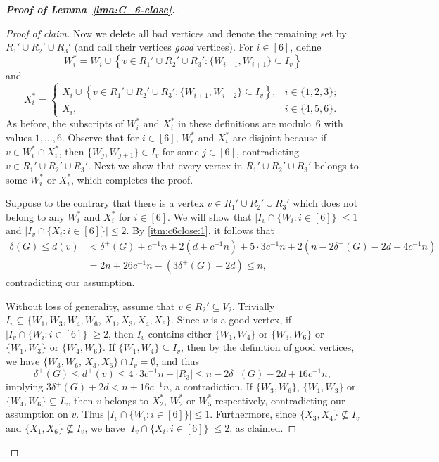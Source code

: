 \documentclass[11pt]{article}
\newenvironment{proofclaim}[1][Proof of claim]{\begin{proof}[#1]\renewcommand*{\qedsymbol}{\(\blacksquare\)}}{\end{proof}}
\numberwithin{equation}{section}
\begin{document}
\begin{proof}[\textbf{Proof of Lemma~\ref{lma:C_6-close}.}]
\begin{proofclaim}
Now we delete all bad vertices and denote the remaining set by $R_1'\cup R_2' \cup R_3'$ (and call their vertices \emph{good} vertices). For $i\in [6]$, define $$W_i^* = W_i\cup \left\{v\in R_1'\cup R_2' \cup R_3': \{W_{i-1},W_{i+1}\}\subseteq I_v\right\}$$ and $$X_{i}^* =\begin{cases}
      X_{i}\cup \left\{v\in R_1'\cup R_2' \cup R_3': \{ W_{i+1},W_{i-2}\}\subseteq I_v\right\} , & i\in \{1,2,3\};\\
      X_i, & i\in \{4,5,6\}.
     \end{cases} $$ 
As before, the subscripts of $W_i^*$ and $X_i^*$ in these definitions are modulo~$6$ with values $1, \dots, 6$. 
Observe that for $i\in [6]$, $W_i^*$ and $X_i^*$ are disjoint because if $v\in W_i^*\cap X_i^*$, then $\{ W_j, W_{j+1} \} \in I_v$ for some $j\in [6]$, contradicting $v\in R_1'\cup R_2' \cup R_3'$.
Next we show that every vertex in $R_1'\cup R_2' \cup R_3'$ belongs to some $W_i^*$ or $X_{i}^*$, which completes the proof.

Suppose to the contrary that there is a vertex $v\in R_1'\cup R_2' \cup R_3'$ which does not belong to any $W_i^*$ and $X_{i}^*$ for $i\in [6]$. We will show that $|I_v\cap \{W_i: i\in [6]\} |\le 1$ and $|I_v\cap \{X_i: i\in [6] \}|\le 2$. By \ref{itm:c6close:1}, 
it follows that
\begin{align*}
	\delta(G)\le d(v)&< \delta^+(G) +c^{-1}n+2(d+c^{-1}n)+5\cdot 3c^{-1}n+2\left(n-2\delta^+(G)-2d+4c^{-1}n\right)\\ &= 2n+26c^{-1}n- \left(3\delta^+(G) +2d\right)\le n,
\end{align*}
contradicting our assumption.

Without loss of generality, assume that $v\in R_2'\subseteq V_2$. Trivially $I_v\subseteq\{W_1,W_3,W_4, W_6$, $X_1,X_3,X_4, X_6\}$. Since $v$ is a good vertex, if $|I_v\cap \{W_i: i\in [6]\} |\ge 2$, then $I_v$ contains either 
$\{W_1,W_4\}$ or $\{W_3, W_6\}$ or $\{W_1,W_3\}$ or $\{W_4,W_6\}$.
If $\{W_1,W_4\}\subseteq I_v$, then by the definition of good vertices, we have $\{W_3, W_6$, $X_3, X_6\}\cap I_v= \emptyset$, and thus $$\delta^+(G)\le d^+(v)\le 4\cdot 3c^{-1}n+|R_3|\le n-2\delta^+(G)-2d+16c^{-1}n,$$ implying $3\delta^+(G)+2d<n+16c^{-1}n$, a contradiction. If $\{W_3, W_6\}$, $\{W_1,W_3\}$ or $\{W_4,W_6\} \subseteq I_v$, then $v$ belongs to $X_{2}^*$, $W_2^*$ or $W_{5}^*$ respectively, contradicting our assumption on $v$. Thus $|I_v\cap \{W_i: i\in [6]\} |\le 1$. 
Furthermore, since $\{X_3, X_4\}\not\subseteq I_v$ and $\{X_1, X_6\}\not\subseteq I_v$, we have $|I_v\cap \{X_i: i\in [6] \}|\le 2$, as claimed.
\end{proofclaim}


\end{proof}
\end{document}
